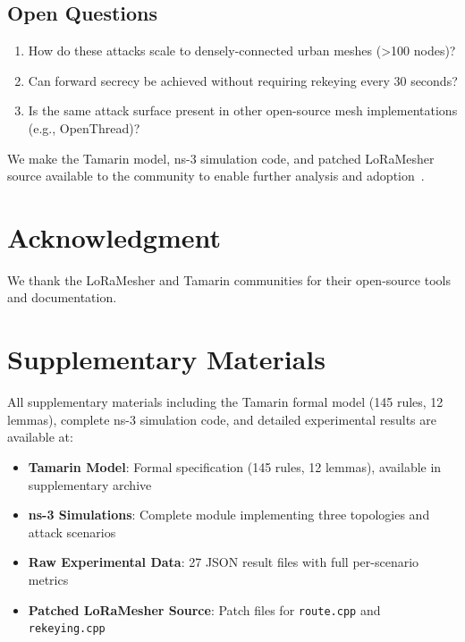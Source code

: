 \documentclass[10pt,journal]{IEEEtran}
\begin{document}
\subsection*{Open Questions}

\begin{enumerate}
	\item How do these attacks scale to densely-connected urban meshes (>100 nodes)?
	\item Can forward secrecy be achieved without requiring rekeying every 30 seconds?
	\item Is the same attack surface present in other open-source mesh implementations (e.g., OpenThread)?
\end{enumerate}

We make the Tamarin model, ns-3 simulation code, and patched LoRaMesher source available to the community to enable further analysis and adoption~\cite{repetto2025-lorawan-drone-attack,shelby2026-zero-trust-iot}.

\section*{Acknowledgment}

We thank the LoRaMesher and Tamarin communities for their open-source tools and documentation.

\appendix

\section{Supplementary Materials}
\label{appendix:supplementary}

All supplementary materials including the Tamarin formal model (145 rules, 12 lemmas), complete ns-3 simulation code, and detailed experimental results are available at:

\begin{itemize}
	\item \textbf{Tamarin Model}: Formal specification (145 rules, 12 lemmas), available in supplementary archive
	\item \textbf{ns-3 Simulations}: Complete module implementing three topologies and attack scenarios
	\item \textbf{Raw Experimental Data}: 27 JSON result files with full per-scenario metrics
	\item \textbf{Patched LoRaMesher Source}: Patch files for \texttt{route.cpp} and \texttt{rekeying.cpp}
\end{itemize}
\end{document}
